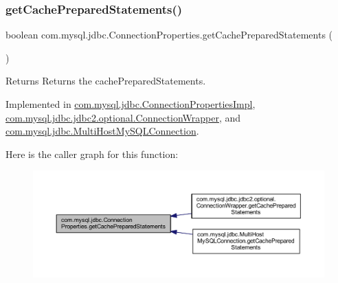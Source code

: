 \subsubsection{\texorpdfstring{get\+Cache\+Prepared\+Statements()}{getCachePreparedStatements()}}
{\footnotesize\ttfamily boolean com.\+mysql.\+jdbc.\+Connection\+Properties.\+get\+Cache\+Prepared\+Statements (\begin{DoxyParamCaption}{ }\end{DoxyParamCaption})}

\begin{DoxyReturn}{Returns}
Returns the cache\+Prepared\+Statements. 
\end{DoxyReturn}


Implemented in \mbox{\hyperlink{classcom_1_1mysql_1_1jdbc_1_1_connection_properties_impl_acb332b27c20f180f7f3ed71bf7d622f0}{com.\+mysql.\+jdbc.\+Connection\+Properties\+Impl}}, \mbox{\hyperlink{classcom_1_1mysql_1_1jdbc_1_1jdbc2_1_1optional_1_1_connection_wrapper_aa4e1e497dd1bc9785a1959db9989a97c}{com.\+mysql.\+jdbc.\+jdbc2.\+optional.\+Connection\+Wrapper}}, and \mbox{\hyperlink{classcom_1_1mysql_1_1jdbc_1_1_multi_host_my_s_q_l_connection_a2f3e7980f5e4eaaa44c0235a6124ec81}{com.\+mysql.\+jdbc.\+Multi\+Host\+My\+S\+Q\+L\+Connection}}.

Here is the caller graph for this function\+:\nopagebreak
\begin{figure}[H]
\begin{center}
\leavevmode
\includegraphics[width=350pt]{interfacecom_1_1mysql_1_1jdbc_1_1_connection_properties_a74f3ae7b24eeb5ed44da99c60f664ac4_icgraph}
\end{center}
\end{figure}
\mbox{\label{interfacecom_1_1mysql_1_1jdbc_1_1_connection_properties_a8827c77268d7c5b63d6f225cb955f70c}} 
